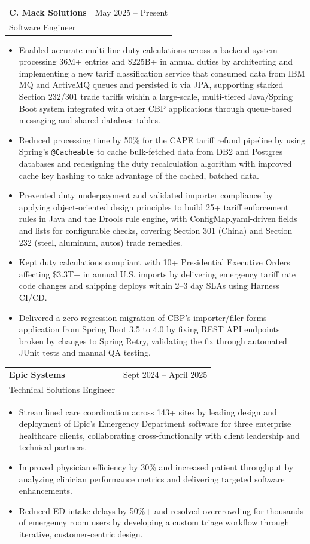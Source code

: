 \documentclass[letterpaper,11pt]{article}
\makeatletter
\newcommand{\resumeItem}[1]{
  \item\small{
    {#1 \vspace{-2pt}}
  }
}
\newcommand{\resumeSubheading}[4]{
  \vspace{-1pt}\item
    \begin{tabular*}{0.97\textwidth}[t]{l@{\extracolsep{\fill}}r}
      \textbf{#1} & #2 \\
      #3 & \textit{\small #4} \\
    \end{tabular*}\vspace{-5pt}
}
\newcommand{\resumeItemListStart}{\begin{itemize}[itemsep=-1pt]}
\newcommand{\resumeItemListEnd}{\end{itemize}\vspace{-4pt}}
\makeatother
\begin{document}
    \resumeSubheading
      {C. Mack Solutions}{May 2025 -- Present}
      {Software Engineer}{}
      \resumeItemListStart
        \resumeItem{Enabled accurate multi-line duty calculations across a backend system processing 36M+ entries and \$225B+ in annual duties by architecting and implementing a new tariff classification service that consumed data from IBM MQ and ActiveMQ queues and persisted it via JPA, supporting stacked Section 232/301 trade tariffs within a large-scale, multi-tiered Java/Spring Boot system integrated with other CBP applications through queue-based messaging and shared database tables.}
        \resumeItem{Reduced processing time by 50\% for the CAPE tariff refund pipeline by using Spring's \texttt{@Cacheable} to cache bulk-fetched data from DB2 and Postgres databases and redesigning the duty recalculation algorithm with improved cache key hashing to take advantage of the cached, batched data.}
        \resumeItem{Prevented duty underpayment and validated importer compliance by applying object-oriented design principles to build 25+ tariff enforcement rules in Java and the Drools rule engine, with ConfigMap.yaml-driven fields and lists for configurable checks, covering Section 301 (China) and Section 232 (steel, aluminum, autos) trade remedies.}
        \resumeItem{Kept duty calculations compliant with 10+ Presidential Executive Orders affecting \$3.3T+ in annual U.S. imports by delivering emergency tariff rate code changes and shipping deploys within 2--3 day SLAs using Harness CI/CD.}
        \resumeItem{Delivered a zero-regression migration of CBP's importer/filer forms application from Spring Boot 3.5 to 4.0 by fixing REST API endpoints broken by changes to Spring Retry, validating the fix through automated JUnit tests and manual QA testing.}
      \resumeItemListEnd

    \resumeSubheading
      {Epic Systems}{Sept 2024 -- April 2025}
      {Technical Solutions Engineer}{}
      \resumeItemListStart
        \resumeItem{Streamlined care coordination across 143+ sites by leading design and deployment of Epic's Emergency Department software for three enterprise healthcare clients, collaborating cross-functionally with client leadership and technical partners.}
        \resumeItem{Improved physician efficiency by 30\% and increased patient throughput by analyzing clinician performance metrics and delivering targeted software enhancements.}
        \resumeItem{Reduced ED intake delays by 50\%+ and resolved overcrowding for thousands of emergency room users by developing a custom triage workflow through iterative, customer-centric design.}
      \resumeItemListEnd
\end{document}
